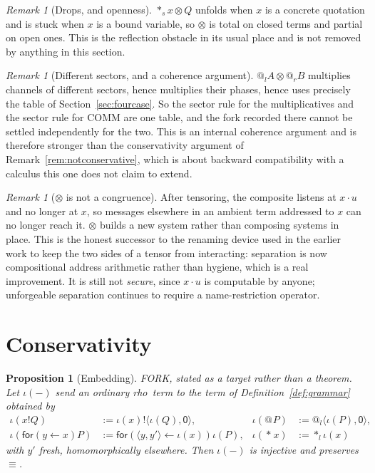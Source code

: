 \documentclass[11pt]{article}
\makeatletter
\newtheorem{proposition}[theorem]{Proposition}
\theoremstyle{definition}
\theoremstyle{remark}
\newtheorem{remark}[theorem]{Remark}
\newcommand{\rhoc}{\textsf{rho}}
\newcommand{\pzero}{\mathsf{0}}
\newcommand{\quo}[1]{\ensuremath{@_{#1}}}
\newcommand{\drp}[1]{\ensuremath{*_{#1}}}
\newcommand{\dip}[2]{\ensuremath{\langle #1 , #2 \rangle}}
\newcommand{\scong}{\ensuremath{\equiv}}
\makeatother
\begin{document}
\begin{remark}[Drops, and openness]
$\drp{s}x \otimes Q$ unfolds when $x$ is a concrete quotation and is stuck when
$x$ is a bound variable, so $\otimes$ is total on closed terms and partial on
open ones. This is the reflection obstacle in its usual place and is not removed
by anything in this section.
\end{remark}

\begin{remark}[Different sectors, and a coherence argument]
\label{rem:tensorsectors}
$\quo{l}A \otimes \quo{r}B$ multiplies channels of different sectors, hence
multiplies their phases, hence uses precisely the table of
Section~\ref{sec:fourcase}. So the sector rule for the multiplicatives and the
sector rule for COMM are one table, and the fork recorded there cannot be
settled independently for the two. This is an internal coherence argument and is
therefore stronger than the conservativity argument of
Remark~\ref{rem:notconservative}, which is about backward compatibility with a
calculus this one does not claim to extend.
\end{remark}

\begin{remark}[$\otimes$ is not a congruence]
\label{rem:notcongruence}
After tensoring, the composite listens at $x \cdot u$ and no longer at $x$, so
messages elsewhere in an ambient term addressed to $x$ can no longer reach it.
$\otimes$ builds a new system rather than composing systems in place. This is
the honest successor to the renaming device used in the earlier work to keep the
two sides of a tensor from interacting: separation is now compositional address
arithmetic rather than hygiene, which is a real improvement. It is still not
\emph{secure}, since $x \cdot u$ is computable by anyone; unforgeable separation
continues to require a name-restriction operator.
\end{remark}

\section{Conservativity}
\label{sec:conservativity}

\begin{proposition}[Embedding]
\label{prop:conservativity}
FORK, stated as a target rather than a theorem. Let
$\iota(-)$ send an ordinary \rhoc\ term to the term of
Definition~\ref{def:grammar} obtained by
\begin{align*}
  \iota(x!Q) &:= \iota(x) ! \dip{\iota(Q)}{\pzero},
  &
  \iota(\quo{}P) &:= \quo{l}\dip{\iota(P)}{\pzero}, \\
  \iota(\mathsf{for}(y \leftarrow x)P) &:=
    \mathsf{for}(\dip{y}{y'} \leftarrow \iota(x))\iota(P),
  &
  \iota(\drp{}x) &:= \drp{l}\iota(x)
\end{align*}
with $y'$ fresh, homomorphically elsewhere. Then $\iota(-)$ is
injective and preserves $\scong$.
\end{proposition}
\end{document}

